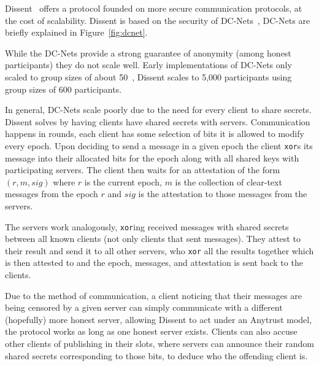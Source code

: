 \DCNet

Dissent~\cite{wolinsky2012dissent} offers a protocol founded on more secure
communication protocols, at the cost of scalability. Dissent is based on the
security of DC-Nets~\cite{chaum1988dining}, DC-Nets are briefly explained in
Figure~\ref{fig:dcnet}.

While the DC-Nets provide a strong guarantee of anonymity (among honest
participants) they do not scale well. Early implementations of DC-Nets only
scaled to group sizes of about 50~\cite{corrigan2010dissent, goel2003herbivore},
Dissent scales to 5,000 participants using group sizes of 600 participants.

In general, DC-Nets scale poorly due to the need for every client to share
secrets. Dissent solves by having clients have shared secrets with servers.
Communication happens in rounds, each client has some selection of bits it is
allowed to modify every epoch. Upon deciding to send a message in a given epoch
the client \texttt{xor}s its message into their allocated bits for the epoch
along with all shared keys with participating servers. The client then waits for
an attestation of the form $(r, m, sig)$ where $r$ is the current epoch, $m$ is
the collection of clear-text messages from the epoch $r$ and $sig$ is the
attestation to those messages from the servers.

The servers work analogously, \texttt{xor}ing received messages with shared
secrets between all known clients (not only clients that sent messages). They
attest to their result and send it to all other servers, who \texttt{xor} all
the results together which is then attested to and the epoch, messages, and
attestation is sent back to the clients.

Due to the method of communication, a client noticing that their messages are
being censored by a given server can simply communicate with a different
(hopefully) more honest server, allowing Dissent to act under an Anytrust model,
the protocol works as long as one honest server exists. Clients can also accuse
other clients of publishing in their slots, where servers can announce their
random shared secrets corresponding to those bits, to deduce who the offending
client is.
